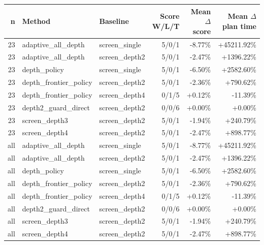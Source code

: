 \begin{tabular}{rllrrr}
\toprule
n & Method & Baseline & Score W/L/T & Mean $\Delta$ score & Mean $\Delta$ plan time \\
\midrule
23 & adaptive_all_depth & screen_single & 5/0/1 & -8.77\% & +45211.92\% \\
23 & adaptive_all_depth & screen_depth2 & 5/0/1 & -2.47\% & +1396.22\% \\
23 & depth_policy & screen_single & 5/0/1 & -6.50\% & +2582.60\% \\
23 & depth_frontier_policy & screen_depth2 & 5/0/1 & -2.36\% & +790.62\% \\
23 & depth_frontier_policy & screen_depth4 & 0/1/5 & +0.12\% & -11.39\% \\
23 & depth2_guard_direct & screen_depth2 & 0/0/6 & +0.00\% & +0.00\% \\
23 & screen_depth3 & screen_depth2 & 5/0/1 & -1.94\% & +240.79\% \\
23 & screen_depth4 & screen_depth2 & 5/0/1 & -2.47\% & +898.77\% \\
all & adaptive_all_depth & screen_single & 5/0/1 & -8.77\% & +45211.92\% \\
all & adaptive_all_depth & screen_depth2 & 5/0/1 & -2.47\% & +1396.22\% \\
all & depth_policy & screen_single & 5/0/1 & -6.50\% & +2582.60\% \\
all & depth_frontier_policy & screen_depth2 & 5/0/1 & -2.36\% & +790.62\% \\
all & depth_frontier_policy & screen_depth4 & 0/1/5 & +0.12\% & -11.39\% \\
all & depth2_guard_direct & screen_depth2 & 0/0/6 & +0.00\% & +0.00\% \\
all & screen_depth3 & screen_depth2 & 5/0/1 & -1.94\% & +240.79\% \\
all & screen_depth4 & screen_depth2 & 5/0/1 & -2.47\% & +898.77\% \\
\bottomrule
\end{tabular}
